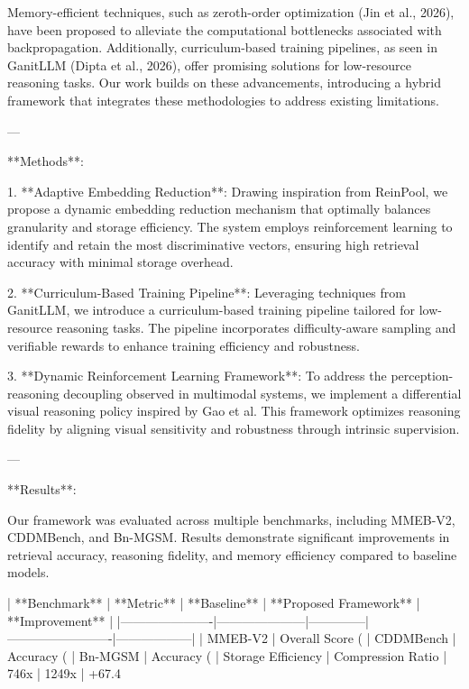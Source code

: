 Memory-efficient techniques, such as zeroth-order optimization (Jin et al., 2026), have been proposed to alleviate the computational bottlenecks associated with backpropagation. Additionally, curriculum-based training pipelines, as seen in GanitLLM (Dipta et al., 2026), offer promising solutions for low-resource reasoning tasks. Our work builds on these advancements, introducing a hybrid framework that integrates these methodologies to address existing limitations.  

---

**Methods**:  

1. **Adaptive Embedding Reduction**:  
   Drawing inspiration from ReinPool, we propose a dynamic embedding reduction mechanism that optimally balances granularity and storage efficiency. The system employs reinforcement learning to identify and retain the most discriminative vectors, ensuring high retrieval accuracy with minimal storage overhead.  

2. **Curriculum-Based Training Pipeline**:  
   Leveraging techniques from GanitLLM, we introduce a curriculum-based training pipeline tailored for low-resource reasoning tasks. The pipeline incorporates difficulty-aware sampling and verifiable rewards to enhance training efficiency and robustness.  

3. **Dynamic Reinforcement Learning Framework**:  
   To address the perception-reasoning decoupling observed in multimodal systems, we implement a differential visual reasoning policy inspired by Gao et al. This framework optimizes reasoning fidelity by aligning visual sensitivity and robustness through intrinsic supervision.  

---

**Results**:  

Our framework was evaluated across multiple benchmarks, including MMEB-V2, CDDMBench, and Bn-MGSM. Results demonstrate significant improvements in retrieval accuracy, reasoning fidelity, and memory efficiency compared to baseline models.  

| **Benchmark**       | **Metric**          | **Baseline** | **Proposed Framework** | **Improvement** |  
|----------------------|---------------------|--------------|-------------------------|------------------|  
| MMEB-V2             | Overall Score (%
| CDDMBench           | Accuracy (%
| Bn-MGSM             | Accuracy (%
| Storage Efficiency  | Compression Ratio   | 746x         | 1249x                  | +67.4%

